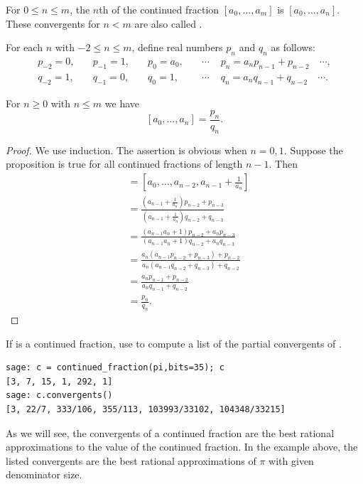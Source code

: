 \begin{definition}
For $0\leq n\leq m$, the $n$th  of the
continued fraction $[a_0,\ldots,a_m]$
is $[a_0,\ldots, a_n]$.  These convergents for $n<m$ are
also called .
\end{definition}

For each $n$ with $-2\leq n\leq m$,
define real numbers $p_n$ and $q_n$ as follows:
$$\begin{array}{lllcl}
  p_{-2}=0, & \quad p_{-1} = 1, & \quad  p_0 = a_0,\quad
                &\cdots &\,\,p_n = a_n p_{n-1} + p_{n-2} \quad \cdots,\\
  q_{-2}=1, & \quad q_{-1} = 0, &\quad q_0 = 1, \quad
                &\cdots &\,\,q_n = a_n q_{n-1} + q_{n-2} \quad \cdots.
\end{array}
$$

\begin{proposition}\label{prop:convergents}%
For $n\geq 0$ with $n\leq m$ we have $$ [a_0, \ldots, a_n] = \frac{p_n}{q_n}.$$
\end{proposition}
\begin{proof}
We use induction.  The assertion is obvious when $n=0,1$.  Suppose the
proposition is true for all continued fractions of length $n-1$.  Then
\begin{align*}
[a_0,\ldots, a_n]
 &= [a_0,\ldots,a_{n-2}, a_{n-1} + \frac{1}{a_n}]\\
 &= \frac{\left( a_{n-1} + \frac{1}{a_n}\right) p_{n-2} + p_{n-3}}
         {\left( a_{n-1} + \frac{1}{a_n}\right) q_{n-2} + q_{n-3}}\\
 &= \frac{(a_{n-1}a_n +1)p_{n-2} + a_n p_{n-3}}
         {(a_{n-1}a_n +1)q_{n-2} + a_n q_{n-3}}\\
 &= \frac{a_n(a_{n-1}p_{n-2} + p_{n-3}) + p_{n-2}}
         {a_n(a_{n-1}q_{n-2} + q_{n-3}) + q_{n-2}}\\
 &= \frac{a_n p_{n-1} + p_{n-2}}{a_n q_{n-1} + q_{n-2}}\\
 &= \frac{p_n}{q_n}.
\end{align*}
\end{proof}
\begin{sg}
If  is a continued fraction, use 
to compute a list of the partial
convergents of .
\begin{verbatim}
sage: c = continued_fraction(pi,bits=35); c
[3, 7, 15, 1, 292, 1]
sage: c.convergents()
[3, 22/7, 333/106, 355/113, 103993/33102, 104348/33215]
\end{verbatim}
As we will see, the convergents of a continued fraction
are the best rational approximations to the value of
the continued fraction.  In the example above, the
listed convergents are the best rational approximations
of $\pi$ with given denominator size.
\end{sg}

